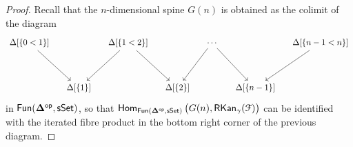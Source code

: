 \begin{proof}
    Recall that the $n$-dimensional spine $G(n)$ is obtained as the colimit of
    the diagram
    \begin{equation}
        \begin{tikzcd}[ampersand replacement=\&,column sep=small]
            {\Delta[\{0<1\}]} \&\& {\Delta[\{1<2\}]} \&\& \cdots \&\&
            {\Delta[\{n-1<n\}]} \\
            \\
            \& {\Delta[\{1\}]} \&\& {\Delta[\{2\}]} \&\& {\,\Delta[\{n-1\}]}
            \arrow[from=1-1, to=3-2]
            \arrow[from=1-3, to=3-2]
            \arrow[from=1-3, to=3-4]
            \arrow[from=1-5, to=3-4]
            \arrow[from=1-5, to=3-6]
            \arrow[from=1-7, to=3-6]
        \end{tikzcd}
    \end{equation}
    in $\operatorname{{\sf Fun}}(\mathbf\Delta^{\mathsf{op}},\operatorname{\sf sSet})$, so that
    $\operatorname{\sf Hom}_{\operatorname{\sf Fun}(\mathbf\Delta^{\mathsf{op}},\operatorname{\sf sSet})}\big(G(n), \operatorname{{\sf RKan}}_{\gamma}(\mathcal F)\big)$ can be
    identified with the iterated fibre product in the bottom right corner of
    the previous diagram.


\end{proof}
